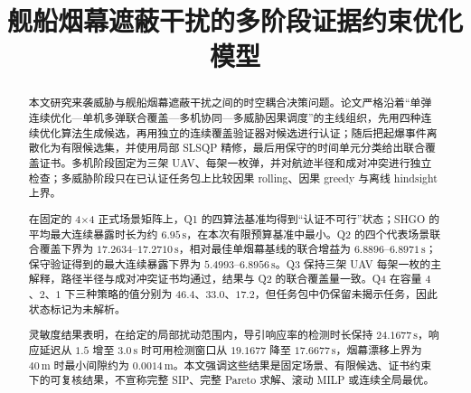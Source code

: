 \documentclass[withoutpreface,bwprint]{cumcmthesis}
\title{舰船烟幕遮蔽干扰的多阶段证据约束优化模型}
\begin{document}
\maketitle

\begin{abstract}
本文研究来袭威胁与舰船烟幕遮蔽干扰之间的时空耦合决策问题。论文严格沿着“单弹连续优化—单机多弹联合覆盖—多机协同—多威胁因果调度”的主线组织，先用四种连续优化算法生成候选，再用独立的连续覆盖验证器对候选进行认证；随后把起爆事件离散化为有限候选集，并使用局部 SLSQP 精修，最后用保守的时间单元分类给出联合覆盖证书。多机阶段固定为三架 UAV、每架一枚弹，并对航迹半径和成对冲突进行独立检查；多威胁阶段只在已认证任务包上比较因果 rolling、因果 greedy 与离线 hindsight 上界。

在固定的 4\(\times\)4 正式场景矩阵上，Q1 的四算法基准均得到“认证不可行”状态；SHGO 的平均最大连续暴露时长为约 $6.95\,\mathrm{s}$，在本次有限预算基准中最小。Q2 的四个代表场景联合覆盖下界为 $17.2634$--$17.2710\,\mathrm{s}$，相对最佳单烟幕基线的联合增益为 $6.8896$--$6.8971\,\mathrm{s}$；保守验证得到的最大连续暴露下界为 $5.4993$--$6.8956\,\mathrm{s}$。Q3 保持三架 UAV 每架一枚的主解释，路径半径与成对冲突证书均通过，结果与 Q2 的联合覆盖量一致。Q4 在容量 $4$、$2$、$1$ 下三种策略的值分别为 $46.4$、$33.0$、$17.2$，但任务包中仍保留未揭示任务，因此状态标记为未解析。

灵敏度结果表明，在给定的局部扰动范围内，导引响应率的检测时长保持 $24.1677\,\mathrm{s}$，响应延迟从 $1.5$ 增至 $3.0\,\mathrm{s}$ 时可用检测窗口从 $19.1677$ 降至 $17.6677\,\mathrm{s}$，烟幕漂移上界为 $40\,\mathrm{m}$ 时最小间隙约为 $0.0014\,\mathrm{m}$。本文强调这些结果是固定场景、有限候选、证书约束下的可复核结果，不宣称完整 SIP、完整 Pareto 求解、滚动 MILP 或连续全局最优。

\end{abstract}












\begin{appendices}



\end{appendices}

\nocite{*}


\end{document}
